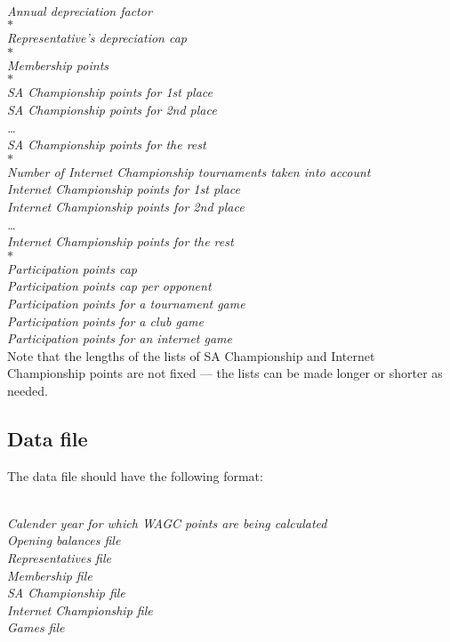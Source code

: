 \documentclass{article}
\begin{document}
\noindent\\
\emph{\flq Annual depreciation factor\frq}\\
$*$\\ 
\emph{\flq Representative's depreciation cap\frq}\\
$*$\\
\emph{\flq Membership points\frq}\\
$*$\\
\emph{\flq SA Championship points for 1st place\frq}\\
\emph{\flq SA Championship points for 2nd place\frq}\\
\emph{\flq \ldots\frq}\\
\emph{\flq SA Championship points for the rest\frq}\\
$*$\\
\emph{\flq Number of Internet Championship tournaments taken into account\frq}\\
\emph{\flq Internet Championship points for 1st place\frq}\\
\emph{\flq Internet Championship points for 2nd place\frq}\\
\emph{\flq \ldots\frq}\\
\emph{\flq Internet Championship points for the rest\frq}\\
$*$\\
\emph{\flq Participation points cap\frq}\\
\emph{\flq Participation points cap per opponent\frq}\\
\emph{\flq Participation points for a tournament game\frq}\\
\emph{\flq Participation points for a club game\frq}\\
\emph{\flq Participation points for an internet game\frq}\\

Note that the lengths of the lists of SA Championship and Internet Championship points are not fixed --- the lists can be made longer or 
shorter as needed.

\subsection{Data file}

The data file should have the following format:

\noindent\\
\emph{\flq Calender year for which WAGC points are being calculated\frq}\\
\emph{\flq Opening balances file\frq}\\
\emph{\flq Representatives file\frq}\\
\emph{\flq Membership file\frq}\\
\emph{\flq SA Championship file\frq}\\
\emph{\flq Internet Championship file\frq}\\
\emph{\flq Games file\frq}
\end{document}
